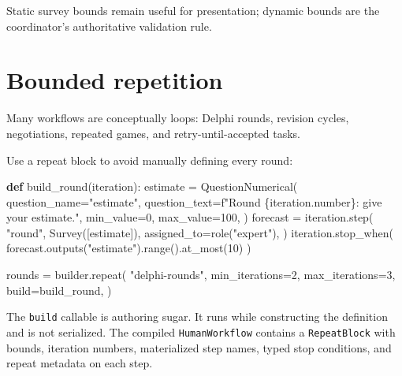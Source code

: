 \documentclass[
  10pt,
]{report}
\newenvironment{Shaded}{}{}
\newcommand{\BuiltInTok}[1]{\textcolor[rgb]{0.00,0.50,0.00}{#1}}
\newcommand{\DecValTok}[1]{\textcolor[rgb]{0.25,0.63,0.44}{#1}}
\newcommand{\KeywordTok}[1]{\textcolor[rgb]{0.00,0.44,0.13}{\textbf{#1}}}
\newcommand{\NormalTok}[1]{#1}
\newcommand{\OperatorTok}[1]{\textcolor[rgb]{0.40,0.40,0.40}{#1}}
\newcommand{\SpecialCharTok}[1]{\textcolor[rgb]{0.25,0.44,0.63}{#1}}
\newcommand{\SpecialStringTok}[1]{\textcolor[rgb]{0.73,0.40,0.53}{#1}}
\newcommand{\StringTok}[1]{\textcolor[rgb]{0.25,0.44,0.63}{#1}}
\begin{document}
Static survey bounds remain useful for presentation; dynamic bounds are
the coordinator's authoritative validation rule.

\chapter{Bounded repetition}\label{bounded-repetition}

Many workflows are conceptually loops: Delphi rounds, revision cycles,
negotiations, repeated games, and retry-until-accepted tasks.

Use a repeat block to avoid manually defining every round:

\begin{Shaded}
\begin{Highlighting}[]
\KeywordTok{def}\NormalTok{ build\_round(iteration):}
\NormalTok{    estimate }\OperatorTok{=}\NormalTok{ QuestionNumerical(}
\NormalTok{        question\_name}\OperatorTok{=}\StringTok{"estimate"}\NormalTok{,}
\NormalTok{        question\_text}\OperatorTok{=}\SpecialStringTok{f"Round }\SpecialCharTok{\{}\NormalTok{iteration}\SpecialCharTok{.}\NormalTok{number}\SpecialCharTok{\}}\SpecialStringTok{: give your estimate."}\NormalTok{,}
\NormalTok{        min\_value}\OperatorTok{=}\DecValTok{0}\NormalTok{,}
\NormalTok{        max\_value}\OperatorTok{=}\DecValTok{100}\NormalTok{,}
\NormalTok{    )}
\NormalTok{    forecast }\OperatorTok{=}\NormalTok{ iteration.step(}
        \StringTok{"round"}\NormalTok{,}
\NormalTok{        Survey([estimate]),}
\NormalTok{        assigned\_to}\OperatorTok{=}\NormalTok{role(}\StringTok{"expert"}\NormalTok{),}
\NormalTok{    )}
\NormalTok{    iteration.stop\_when(}
\NormalTok{        forecast.outputs(}\StringTok{"estimate"}\NormalTok{).}\BuiltInTok{range}\NormalTok{().at\_most(}\DecValTok{10}\NormalTok{)}
\NormalTok{    )}

\NormalTok{rounds }\OperatorTok{=}\NormalTok{ builder.repeat(}
    \StringTok{"delphi{-}rounds"}\NormalTok{,}
\NormalTok{    min\_iterations}\OperatorTok{=}\DecValTok{2}\NormalTok{,}
\NormalTok{    max\_iterations}\OperatorTok{=}\DecValTok{3}\NormalTok{,}
\NormalTok{    build}\OperatorTok{=}\NormalTok{build\_round,}
\NormalTok{)}
\end{Highlighting}
\end{Shaded}

The \texttt{build} callable is authoring sugar. It runs while
constructing the definition and is not serialized. The compiled
\texttt{HumanWorkflow} contains a \texttt{RepeatBlock} with bounds,
iteration numbers, materialized step names, typed stop conditions, and
repeat metadata on each step.
\end{document}
